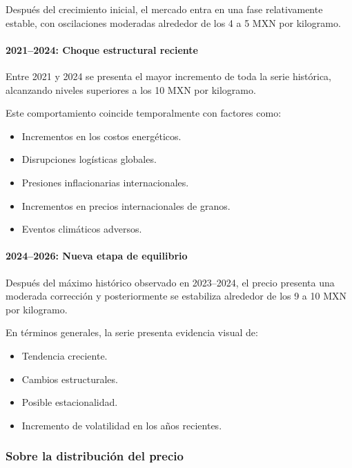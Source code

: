 \documentclass[11pt]{article}
\providecommand{\tightlist}{%
      \setlength{\itemsep}{0pt}\setlength{\parskip}{0pt}}
\begin{document}
Después del crecimiento inicial, el mercado entra en una fase
relativamente estable, con oscilaciones moderadas alrededor de los 4 a 5
MXN por kilogramo.

\hypertarget{choque-estructural-reciente}{%
\paragraph{2021--2024: Choque estructural
reciente}\label{choque-estructural-reciente}}

Entre 2021 y 2024 se presenta el mayor incremento de toda la serie
histórica, alcanzando niveles superiores a los 10 MXN por kilogramo.

Este comportamiento coincide temporalmente con factores como:

\begin{itemize}
\tightlist
\item
  Incrementos en los costos energéticos.
\item
  Disrupciones logísticas globales.
\item
  Presiones inflacionarias internacionales.
\item
  Incrementos en precios internacionales de granos.
\item
  Eventos climáticos adversos.
\end{itemize}

\hypertarget{nueva-etapa-de-equilibrio}{%
\paragraph{2024--2026: Nueva etapa de
equilibrio}\label{nueva-etapa-de-equilibrio}}

Después del máximo histórico observado en 2023--2024, el precio presenta
una moderada corrección y posteriormente se estabiliza alrededor de los
9 a 10 MXN por kilogramo.

En términos generales, la serie presenta evidencia visual de:

\begin{itemize}
\tightlist
\item
  Tendencia creciente.
\item
  Cambios estructurales.
\item
  Posible estacionalidad.
\item
  Incremento de volatilidad en los años recientes.
\end{itemize}

\hypertarget{sobre-la-distribuciuxf3n-del-precio}{%
\subsubsection{Sobre la distribución del
precio}\label{sobre-la-distribuciuxf3n-del-precio}}
\end{document}
